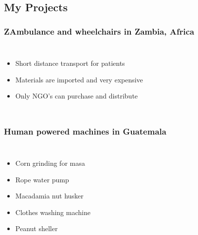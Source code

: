 \documentclass[]{beamer}
\begin{document}
\subsection{My Projects}
\frame
{
    \frametitle{ZAmbulance and wheelchairs in Zambia, Africa}
    \begin{columns}[t]
        \column{6cm}
        \begin{itemize}[<+->]
            \item Short distance transport for patients
            \item Materials are imported and very expensive
            \item Only NGO's can purchase and distribute
        \end{itemize}
        \column{5cm}
    \end{columns}
}
\frame
{
    \frametitle{Human powered machines in Guatemala}
    \begin{columns}[t]
        \column{6cm}
        \begin{itemize}[<+->]
            \item Corn grinding for masa
            \item Rope water pump
            \item Macadamia nut husker
            \item Clothes washing machine
            \item Peanut sheller
        \end{itemize}
        \column{5cm}
    \end{columns}
}
\end{document}

